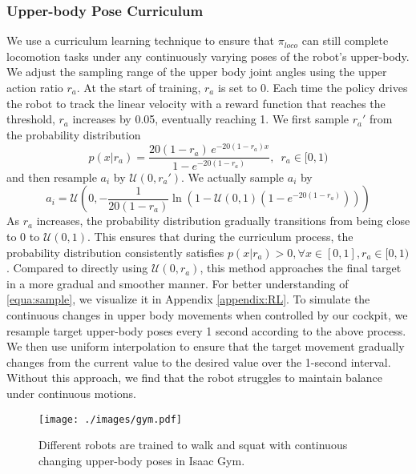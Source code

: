 \subsubsection{Upper-body Pose Curriculum}
We use a curriculum learning technique to ensure that $\pi_{loco}$ can still complete locomotion tasks under any continuously varying poses of the robot's upper-body. We adjust the sampling range of the upper body joint angles using the upper action ratio $r_a$. At the start of training, $r_a$ is set to 0. Each time the policy drives the robot to track the linear velocity with a reward function that reaches the threshold, $r_a$ increases by 0.05, eventually reaching 1. We first sample $r_a'$ from the probability distribution
\begin{equation}
    p(x|r_a) = \frac{20(1 - r_a) \, e^{-20(1 - r_a)x}}{1 - e^{-20(1 - r_a)}},\,\,\,r_a\in [0, 1)
\end{equation}
and then resample $a_i$ by $\mathcal{U}(0, r_a')$. We actually sample $a_i$ by
\begin{equation}
\label{equa:sample}
    a_i = \mathcal{U}(0, -\frac{1}{20 (1 - r_a)} \ln\left(1 - \mathcal{U}(0, 1)\left(1 - e^{-20 (1 - r_a)}\right)\right))
\end{equation}
As $r_a$ increases, the probability distribution gradually transitions from being close to 0 to $\mathcal{U}(0,1)$. This ensures that during the curriculum process, the probability distribution consistently satisfies $p(x|r_a)>0,\forall x\in[0,1],r_a\in[0,1)$. Compared to directly using $\mathcal{U}(0,r_a)$, this method approaches the final target in a more gradual and smoother manner. For better understanding of \cref{equa:sample}, we visualize it in Appendix \ref{appendix:RL}.
To simulate the continuous changes in upper body movements when controlled by our cockpit, we resample target upper-body poses every 1 second according to the above process. We then use uniform interpolation to ensure that the target movement gradually changes from the current value to the desired value over the 1-second interval. Without this approach, we find that the robot struggles to maintain balance under continuous motions.

\begin{figure}[!ht]
  \centering
  \texttt{[image: ./images/gym.pdf]}
  \caption{Different robots are trained to walk and squat with continuous changing upper-body poses in Isaac Gym.}
  \label{fig:gym}
\end{figure}


